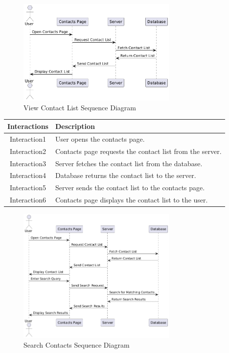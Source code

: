 \begin{figure}[h]
    \centering
    \includegraphics[width=0.7\textwidth]{images/view_contact_list.png} %
    \caption{View Contact List Sequence Diagram}
    \label{fig:example}
\end{figure}


\begin{longtable}{|c|p{10cm}|}
    \hline
    \textbf{Interactions} & \textbf{Description} \\
    \hline
    Interaction1 & User opens the contacts page. \\
    \hline
    Interaction2 & Contacts page requests the contact list from the server. \\
    \hline
    Interaction3 & Server fetches the contact list from the database. \\
    \hline
    Interaction4 & Database returns the contact list to the server. \\
    \hline
    Interaction5 & Server sends the contact list to the contacts page. \\
    \hline
    Interaction6 & Contacts page displays the contact list to the user. \\
    \hline
\end{longtable}
\newpage
\begin{figure}[h]
    \centering
    \includegraphics[width=0.7\textwidth]{images/search_contacts.png} %
    \caption{Search Contacts Sequence Diagram}
    \label{fig:example}
\end{figure}


